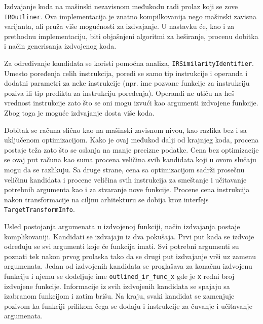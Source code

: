 \documentclass[12pt,oneside]{memoir}
\begin{document}
Izdvajanje koda na mašinski nezavisnom međukodu radi prolaz koji se zove \verb|IROutliner|.
Ova implementacija je znatno kompilkovanija nego mašinski zavisna varijanta, ali pruža više mogućnosti za izdvajanje.
U nastavku će, kao i za prethodnu implementaciju, biti objašnjeni algoritmi za heširanje, procenu dobitka i način generisanja izdvojenog koda.

Za određivanje kandidata se koristi pomoćna analiza, \verb|IRSimilarityIdentifier|.
Umesto poređenja celih instrukcija, poredi se samo tip instrukcije i operanda i dodatni parametri za neke instrukcije (npr. ime pozvane funkcije za instrukciju poziva ili tip predikta za instrukciju poređenja).
Operandi ne utiču na heš vrednost instrukcije zato što se oni mogu izvući kao argumenti izdvojene funkcije.
Zbog toga je moguće izdvajanje dosta više koda.

Dobitak se računa slično kao na mašinski zavisnom nivou, kao razlika bez i sa uključenom optimizacijom.
Kako je ovaj međukod dalji od krajnjeg koda, procena postaje teža zato što se oslanja na manje precizne podatke.
Cena bez optimizacije se ovaj put računa kao suma procena veličina svih kandidata koji u ovom slučaju mogu da se razlikuju.
Sa druge strane, cena sa optimizacijom sadrži prosečnu veličinu kandidata i procene veličina svih instrukcija za smeštanje i učitavanje potrebnih argumenta kao i za stvaranje nove funkcije.
Procene cena instrukcija nakon transformacije na ciljnu arhitekturu se dobija kroz interfejs \verb|TargetTransformInfo|.

Usled postojanja argumenata u izdvojenoj funkciji, način izdvajanja postaje komplikovaniji.
Kandidati se izdvajaju iz dva pokušaja. Prvi put kada se izdvoje određuju se svi argumenti koje će funkcija imati.
Svi potrebni argumenti su poznati tek nakon prvog prolaska tako da se drugi put izdvajanje vrši uz zamenu argumenata.
Jedan od izdvojenih kandidata se proglašava za konačnu izdvojenu funkciju i
njemu se dodeljuje ime \verb|outlined_ir_func_x| gde je \verb|x| redni broj izdvojene funkcije.
Informacije iz svih izdvojenih kandidata se spajaju sa izabranom funkcijom i zatim brišu.
Na kraju, svaki kandidat se zamenjuje pozivom ka funkciji prilikom čega se dodaju i instrukcije za čuvanje i učitavanje argumenata.
\end{document}
